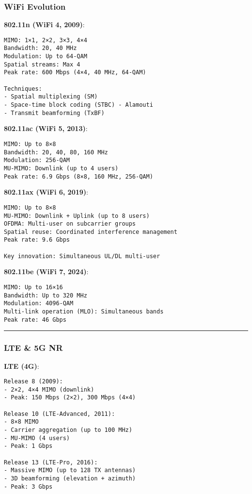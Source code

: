 \subsubsection{WiFi Evolution}\label{wifi-evolution}

\textbf{802.11n (WiFi 4, 2009)}:

\begin{verbatim}
MIMO: 1×1, 2×2, 3×3, 4×4
Bandwidth: 20, 40 MHz
Modulation: Up to 64-QAM
Spatial streams: Max 4
Peak rate: 600 Mbps (4×4, 40 MHz, 64-QAM)

Techniques:
- Spatial multiplexing (SM)
- Space-time block coding (STBC) - Alamouti
- Transmit beamforming (TxBF)
\end{verbatim}

\textbf{802.11ac (WiFi 5, 2013)}:

\begin{verbatim}
MIMO: Up to 8×8
Bandwidth: 20, 40, 80, 160 MHz
Modulation: 256-QAM
MU-MIMO: Downlink (up to 4 users)
Peak rate: 6.9 Gbps (8×8, 160 MHz, 256-QAM)
\end{verbatim}

\textbf{802.11ax (WiFi 6, 2019)}:

\begin{verbatim}
MIMO: Up to 8×8
MU-MIMO: Downlink + Uplink (up to 8 users)
OFDMA: Multi-user on subcarrier groups
Spatial reuse: Coordinated interference management
Peak rate: 9.6 Gbps

Key innovation: Simultaneous UL/DL multi-user
\end{verbatim}

\textbf{802.11be (WiFi 7, 2024)}:

\begin{verbatim}
MIMO: Up to 16×16
Bandwidth: Up to 320 MHz
Modulation: 4096-QAM
Multi-link operation (MLO): Simultaneous bands
Peak rate: 46 Gbps
\end{verbatim}

\begin{center}\rule{0.5\linewidth}{0.5pt}\end{center}

\subsubsection{LTE \& 5G NR}\label{lte-5g-nr}

\textbf{LTE (4G)}:

\begin{verbatim}
Release 8 (2009):
- 2×2, 4×4 MIMO (downlink)
- Peak: 150 Mbps (2×2), 300 Mbps (4×4)

Release 10 (LTE-Advanced, 2011):
- 8×8 MIMO
- Carrier aggregation (up to 100 MHz)
- MU-MIMO (4 users)
- Peak: 1 Gbps

Release 13 (LTE-Pro, 2016):
- Massive MIMO (up to 128 TX antennas)
- 3D beamforming (elevation + azimuth)
- Peak: 3 Gbps
\end{verbatim}

